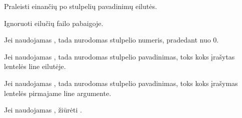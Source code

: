 \documentclass[letterpaper,10pt,lithuanian]{sphinxmanual}
\begin{document}
\begin{fulllineitems}
\begin{fulllineitems}
\label{\detokenize{formules:head}}
\pysigstartsignatures
\pysiglinewithargsret
{}
{}
{}
\pysigstopsignatures
\sphinxAtStartPar
Praleisti  einančių po stulpelių pavadinimų eilutės.

\end{fulllineitems}


\begin{fulllineitems}
\label{\detokenize{formules:tail}}
\pysigstartsignatures
\pysiglinewithargsret
{}
{}
{}
\pysigstopsignatures
\sphinxAtStartPar
Ignoruoti  eilučių failo pabaigoje.

\end{fulllineitems}


\end{fulllineitems}



\begin{fulllineitems}

\pysigstartsignatures
\pysigline
{}
\pysigstopsignatures
\sphinxAtStartPar
Jei naudojamas {\hyperref[\detokenize{formules:header}]{}}, tada nurodomas stulpelio
numeris, pradedant nuo 0.

\sphinxAtStartPar
Jei naudojamas {\hyperref[\detokenize{formules:header}]{}}, tada nurodomas stulpelio
pavadinimas, toks koks įrašytas lentelės line eilutėje.

\sphinxAtStartPar
Jei naudojamas {\hyperref[\detokenize{formules:header}]{}}, tada nurodomas stulpelio
pavadinimas, toks koks įrašymas lentelės pirmajame line argumente.

\end{fulllineitems}



\begin{fulllineitems}

\pysigstartsignatures
\pysigline
{}
\pysigstopsignatures
\sphinxAtStartPar
Jei naudojamas , žiūrėti {\hyperref[\detokenize{formules:kompleksines-strukturos}]{}}.

\end{fulllineitems}
\end{document}
